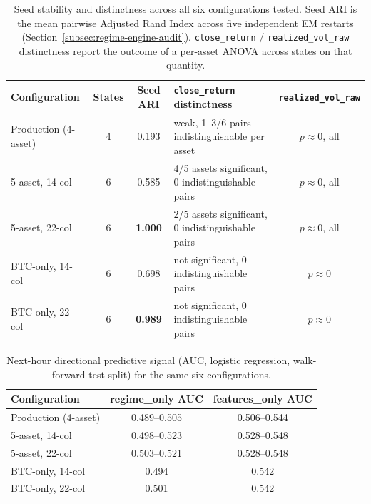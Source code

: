 \begin{table}[H]
\centering
\small
\caption{Seed stability and distinctness across all six configurations tested. Seed ARI is the mean pairwise Adjusted Rand Index across five independent EM restarts (Section~\ref{subsec:regime-engine-audit}). \texttt{close\_return} / \texttt{realized\_vol\_raw} distinctness report the outcome of a per-asset ANOVA across states on that quantity.}
\label{tab:regime-six-model-distinctness}
\begin{tabular}{|l|c|c|p{3.9cm}|c|}
\hline
\textbf{Configuration} & \textbf{States} & \textbf{Seed ARI} & \textbf{\texttt{close\_return} distinctness} & \textbf{\texttt{realized\_vol\_raw}} \\
\hline
Production (4-asset) & 4 & 0.193 & weak, 1--3/6 pairs indistinguishable per asset & $p\approx0$, all \\
\hline
5-asset, 14-col & 6 & 0.585 & 4/5 assets significant, 0 indistinguishable pairs & $p\approx0$, all \\
\hline
5-asset, 22-col & 6 & \textbf{1.000} & 2/5 assets significant, 0 indistinguishable pairs & $p\approx0$, all \\
\hline
BTC-only, 14-col & 6 & 0.698 & not significant, 0 indistinguishable pairs & $p\approx0$ \\
\hline
BTC-only, 22-col & 6 & \textbf{0.989} & not significant, 0 indistinguishable pairs & $p\approx0$ \\
\hline
\end{tabular}
\normalsize
\end{table}

\begin{table}[H]
\centering
\small
\caption{Next-hour directional predictive signal (AUC, logistic regression, walk-forward test split) for the same six configurations.}
\label{tab:regime-six-model-auc}
\begin{tabular}{|l|c|c|}
\hline
\textbf{Configuration} & \textbf{regime\_only AUC} & \textbf{features\_only AUC} \\
\hline
Production (4-asset) & 0.489--0.505 & 0.506--0.544 \\
\hline
5-asset, 14-col & 0.498--0.523 & 0.528--0.548 \\
\hline
5-asset, 22-col & 0.503--0.521 & 0.528--0.548 \\
\hline
BTC-only, 14-col & 0.494 & 0.542 \\
\hline
BTC-only, 22-col & 0.501 & 0.542 \\
\hline
\end{tabular}
\normalsize
\end{table}

